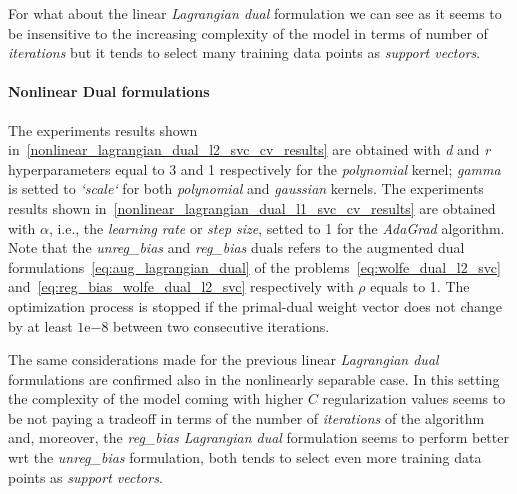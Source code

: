 For what about the linear \emph{Lagrangian dual} formulation we can see as it seems to be insensitive to the increasing complexity of the model in terms of number of \emph{iterations} but it tends to select many training data points as \emph{support vectors}.

\paragraph{Nonlinear Dual formulations}

The experiments results shown in~\ref{nonlinear_lagrangian_dual_l2_svc_cv_results} are obtained with \emph{d} and \emph{r} hyperparameters equal to 3 and 1 respectively for the \emph{polynomial} kernel; \emph{gamma} is setted to \emph{`scale`} for both \emph{polynomial} and \emph{gaussian} kernels. The experiments results shown in~\ref{nonlinear_lagrangian_dual_l1_svc_cv_results} are obtained with $\alpha$, i.e., the \emph{learning rate} or \emph{step size}, setted to 1 for the \emph{AdaGrad} algorithm. Note that the \emph{unreg\_bias} and \emph{reg\_bias} duals refers to the augmented dual formulations~\eqref{eq:aug_lagrangian_dual} of the problems~\eqref{eq:wolfe_dual_l2_svc} and~\eqref{eq:reg_bias_wolfe_dual_l2_svc} respectively with $\rho$ equals to 1. The optimization process is stopped if the primal-dual weight vector does not change by at least $1\mathrm{e}{-8}$  between two consecutive iterations.



The same considerations made for the previous linear \emph{Lagrangian dual} formulations are confirmed also in the nonlinearly separable case. In this setting the complexity of the model coming with higher $C$ regularization values seems to be not paying a tradeoff in terms of the number of \emph{iterations} of the algorithm and, moreover, the \emph{reg\_bias Lagrangian dual} formulation seems to perform better wrt the \emph{unreg\_bias} formulation, both tends to select even more training data points as \emph{support vectors}.

